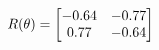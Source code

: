 \documentclass[preview]{standalone}
\begin{document}
\begin{align*}
\special{dvisvgm:raw <g id='unique000'>}R(\theta) = \begin{bmatrix}-0.64 & -0.77\\0.77 & -0.64\end{bmatrix}\special{dvisvgm:raw </g>}
\end{align*}
\end{document}
